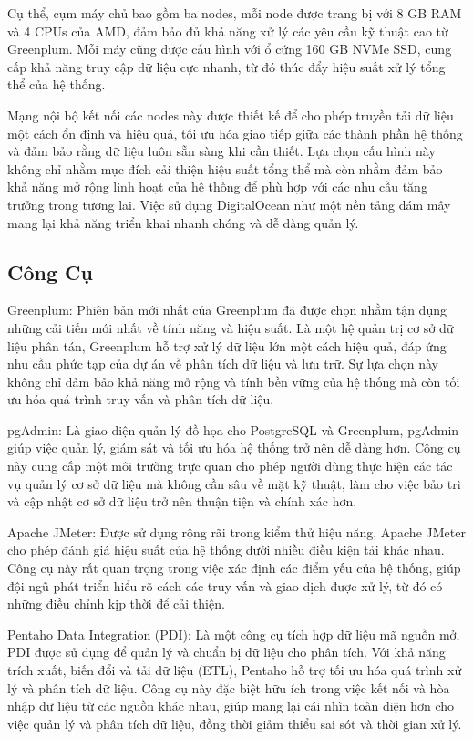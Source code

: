 \documentclass{article}[14pt]
\begin{document}
Cụ thể, cụm máy chủ bao gồm ba nodes, mỗi node được trang bị với 8 GB RAM và 4 CPUs của AMD, đảm bảo đủ khả năng xử lý các yêu cầu kỹ thuật cao từ Greenplum. Mỗi máy cũng được cấu hình với ổ cứng 160 GB NVMe SSD, cung cấp khả năng truy cập dữ liệu cực nhanh, từ đó thúc đẩy hiệu suất xử lý tổng thể của hệ thống.

Mạng nội bộ kết nối các nodes này được thiết kế để cho phép truyền tải dữ liệu một cách ổn định và hiệu quả, tối ưu hóa giao tiếp giữa các thành phần hệ thống và đảm bảo rằng dữ liệu luôn sẵn sàng khi cần thiết. Lựa chọn cấu hình này không chỉ nhằm mục đích cải thiện hiệu suất tổng thể mà còn nhằm đảm bảo khả năng mở rộng linh hoạt của hệ thống để phù hợp với các nhu cầu tăng trưởng trong tương lai. Việc sử dụng DigitalOcean như một nền tảng đám mây mang lại khả năng triển khai nhanh chóng và dễ dàng quản lý.



\subsection{Công Cụ}

Greenplum: Phiên bản mới nhất của Greenplum đã được chọn nhằm tận dụng những cải tiến mới nhất về tính năng và hiệu suất. Là một hệ quản trị cơ sở dữ liệu phân tán, Greenplum hỗ trợ xử lý dữ liệu lớn một cách hiệu quả, đáp ứng nhu cầu phức tạp của dự án về phân tích dữ liệu và lưu trữ. Sự lựa chọn này không chỉ đảm bảo khả năng mở rộng và tính bền vững của hệ thống mà còn tối ưu hóa quá trình truy vấn và phân tích dữ liệu.

pgAdmin: Là giao diện quản lý đồ họa cho PostgreSQL và Greenplum, pgAdmin giúp việc quản lý, giám sát và tối ưu hóa hệ thống trở nên dễ dàng hơn. Công cụ này cung cấp một môi trường trực quan cho phép người dùng thực hiện các tác vụ quản lý cơ sở dữ liệu mà không cần sâu về mặt kỹ thuật, làm cho việc bảo trì và cập nhật cơ sở dữ liệu trở nên thuận tiện và chính xác hơn.

Apache JMeter: Được sử dụng rộng rãi trong kiểm thử hiệu năng, Apache JMeter cho phép đánh giá hiệu suất của hệ thống dưới nhiều điều kiện tải khác nhau. Công cụ này rất quan trọng trong việc xác định các điểm yếu của hệ thống, giúp đội ngũ phát triển hiểu rõ cách các truy vấn và giao dịch được xử lý, từ đó có những điều chỉnh kịp thời để cải thiện.

Pentaho Data Integration (PDI): Là một công cụ tích hợp dữ liệu mã nguồn mở, PDI được sử dụng để quản lý và chuẩn bị dữ liệu cho phân tích. Với khả năng trích xuất, biến đổi và tải dữ liệu (ETL), Pentaho hỗ trợ tối ưu hóa quá trình xử lý và phân tích dữ liệu. Công cụ này đặc biệt hữu ích trong việc kết nối và hòa nhập dữ liệu từ các nguồn khác nhau, giúp mang lại cái nhìn toàn diện hơn cho việc quản lý và phân tích dữ liệu, đồng thời giảm thiểu sai sót và thời gian xử lý.
\end{document}

